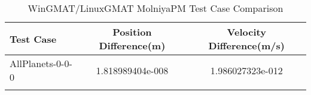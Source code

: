 \begin{table}[htbp!]
\centering
\caption{ WinGMAT/LinuxGMAT MolniyaPM Test Case Comparison}
      \begin{tabular}{lcc}
      \hline\hline
          Test Case & Position Difference(m) & Velocity Difference(m/s) \\
         \hline
         AllPlanets-0-0-0 & 1.818989404e-008 & 1.986027323e-012 \\
      \hline\hline
      \label{Table: MolniyaPM WinGMAT-LinuxGMAT Table} 
\end{tabular}
\end{table}
